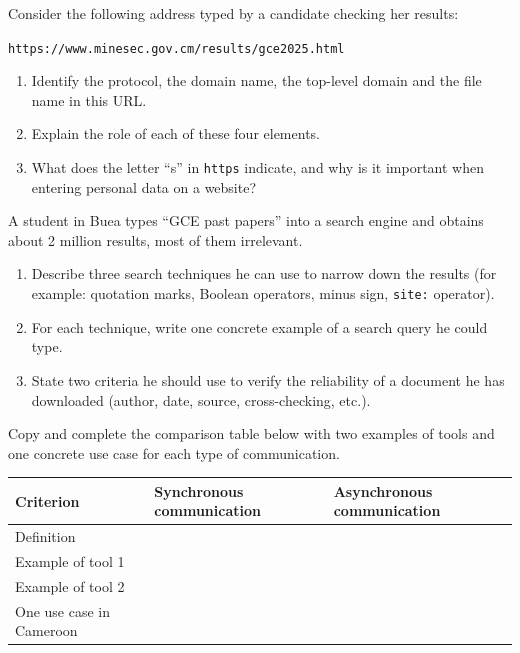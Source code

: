 \documentclass[11pt]{article}
\begin{document}
\begin{exercice}
Consider the following address typed by a candidate checking her results:
\begin{center}
\texttt{https://www.minesec.gov.cm/results/gce2025.html}
\end{center}
\begin{enumerate}
\item Identify the protocol, the domain name, the top-level domain and the file name in this URL.
\item Explain the role of each of these four elements.
\item What does the letter ``s'' in \texttt{https} indicate, and why is it important when entering personal data on a website?
\end{enumerate}
\end{exercice}

\begin{exercice}
A student in Buea types ``GCE past papers'' into a search engine and obtains about 2 million results, most of them irrelevant.
\begin{enumerate}
\item Describe three search techniques he can use to narrow down the results (for example: quotation marks, Boolean operators, minus sign, \texttt{site:} operator).
\item For each technique, write one concrete example of a search query he could type.
\item State two criteria he should use to verify the reliability of a document he has downloaded (author, date, source, cross-checking, etc.).
\end{enumerate}
\end{exercice}

\begin{exercice}
Copy and complete the comparison table below with two examples of tools and one concrete use case for each type of communication.
\begin{center}
\begin{tabularx}{\linewidth}{|l|X|X|}\hline
\rowcolor{popblueL} \textbf{Criterion} & \textbf{Synchronous communication} & \textbf{Asynchronous communication} \\ \hline
Definition & & \\ \hline
Example of tool 1 & & \\ \hline
Example of tool 2 & & \\ \hline
One use case in Cameroon & & \\ \hline
\end{tabularx}
\end{center}
\end{exercice}
\end{document}
